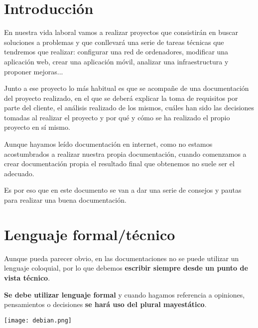 \chapter{Introducción}

En nuestra vida laboral vamos a realizar proyectos que consistirán en buscar soluciones a problemas y que conllevará una serie de tareas técnicas que tendremos que realizar: configurar una red de ordenadores, modificar una aplicación web, crear una aplicación móvil, analizar una infraestructura y proponer mejoras...

Junto a ese proyecto lo más habitual es que se acompañe de una documentación del proyecto realizado, en el que se deberá explicar la toma de requisitos por parte del cliente, el análisis realizado de los mismos, cuáles han sido las decisiones tomadas al realizar el proyecto y por qué y cómo se ha realizado el propio proyecto en sí mismo.

Aunque hayamos leído documentación en internet, como no estamos acostumbrados a realizar nuestra propia documentación, cuando comenzamos a crear documentación propia el resultado final que obtenemos no suele ser el adecuado.

Es por eso que en este documento se van a dar una serie de consejos y pautas para realizar una buena documentación.


\chapter{Lenguaje formal/técnico}

\begin{minipage}{0.68\linewidth}
    \setlength{\parskip}{1.2em}
    \renewcommand{\baselinestretch}{1.4}
    Aunque pueda parecer obvio, en las documentaciones no se puede utilizar un lenguaje coloquial, por lo que debemos \textbf{escribir siempre desde un punto de vista técnico}.

    \textbf{Se debe utilizar lenguaje formal} y cuando hagamos referencia a opiniones, pensamientos o decisiones \textbf{se hará uso del plural mayestático}.
\end{minipage}
\hfill
\begin{minipage}{0.3\linewidth}
    \begin{center}
        \texttt{[image: debian.png]}
    \end{center}
\end{minipage}



